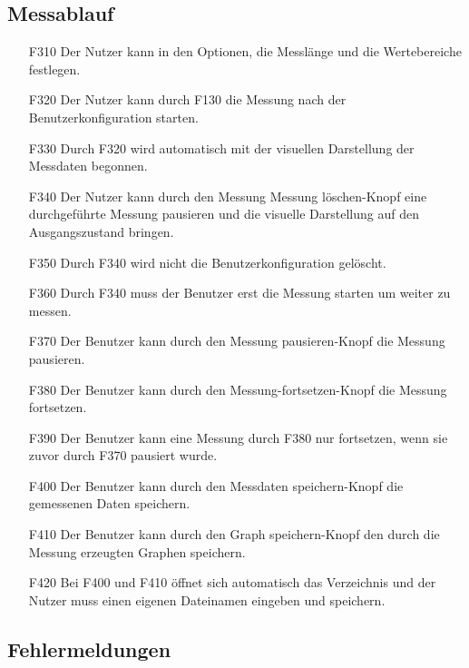 \documentclass[parskip=full]{scrartcl}
\begin{document}
\subsection{Messablauf}

\begin{itemize}

\item[F310] Der Nutzer kann in den Optionen, die Messlänge und die Wertebereiche festlegen.
\item[F320] Der Nutzer kann durch F130 die Messung nach der Benutzerkonfiguration starten.
\item[F330] Durch F320 wird automatisch mit der visuellen Darstellung der Messdaten begonnen.
\item[F340] Der Nutzer kann durch den Messung Messung löschen-Knopf eine durchgeführte Messung pausieren und die visuelle Darstellung auf den Ausgangszustand bringen.
\item[F350] Durch F340 wird nicht die Benutzerkonfiguration gelöscht.
\item[F360] Durch F340 muss der Benutzer erst die Messung starten um weiter zu messen.
\item[F370] Der Benutzer kann durch den Messung pausieren-Knopf die Messung pausieren.
\item[F380] Der Benutzer kann durch den Messung-fortsetzen-Knopf die Messung fortsetzen.
\item[F390] Der Benutzer kann eine Messung durch F380 nur fortsetzen, wenn sie zuvor durch F370 pausiert wurde.
\item[F400] Der Benutzer kann durch den Messdaten speichern-Knopf die gemessenen Daten speichern.
\item[F410] Der Benutzer kann durch den Graph speichern-Knopf den durch die Messung erzeugten Graphen speichern.
\item[F420] Bei F400 und F410 öffnet sich automatisch das Verzeichnis und der Nutzer muss einen eigenen Dateinamen eingeben und speichern. 



\end{itemize}

\subsection{Fehlermeldungen}
\end{document}

